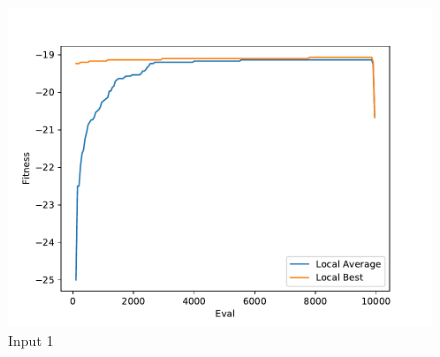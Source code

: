 \documentclass{standalone}
\begin{document}
\begin{figure}[!htb]
	\caption{Input 1}
	\label{fig:graph_1030}
	\includegraphics[width=\textwidth]{../graphs/graphs/1030.pdf}
\end{figure}
\end{document}
